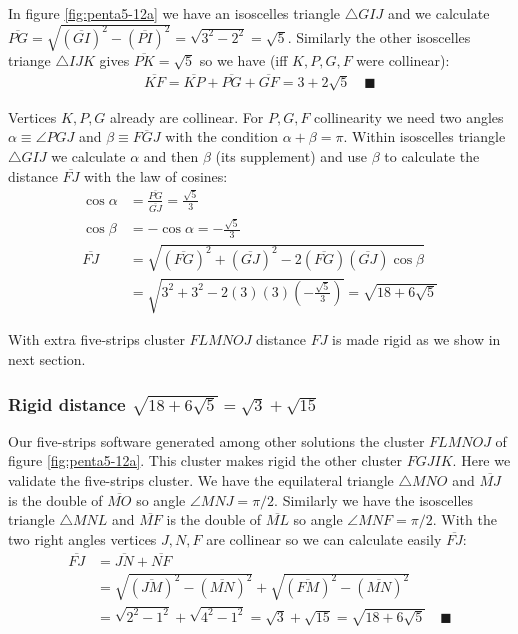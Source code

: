 \documentclass[11pt]{article}
\begin{document}
In figure \ref{fig:penta5-12a} we have an isoscelles triangle $\triangle{GIJ}$ and we calculate $\overline{PG} = \sqrt{(\overline{GI})^2 - (\overline{PI})^2} = \sqrt{3^2 - 2^2} = \sqrt5$. Similarly the other isoscelles triange $\triangle{IJK}$ gives $\overline{PK} = \sqrt{5}$ so we have (iff $K,P,G,F$ were collinear):
\begin{align}
\overline{KF} = \overline{KP} + \overline{PG} + \overline{GF} = 3 + 2\sqrt5 \quad \blacksquare
\end{align}

Vertices $K,P,G$ already are collinear. For $P,G,F$ collinearity we need two angles $\alpha \equiv \angle{PGJ}$ and $\beta \equiv \overline{FGJ}$ with the condition $\alpha + \beta = \pi$. Within isoscelles triangle $\triangle{GIJ}$ we calculate $\alpha$ and then $\beta$ (its supplement) and use $\beta$ to calculate the distance $\overline{FJ}$ with the law of cosines:
\begin{align}
\cos\alpha &= \frac{\overline{PG}}{\overline{GJ}} = \frac{\sqrt5}3 \\
\cos\beta &= -\cos\alpha = -\frac{\sqrt5}3 \\
\overline{FJ} &= \sqrt{(\overline{FG})^2 + (\overline{GJ})^2
 - 2(\overline{FG})(\overline{GJ})\cos\beta} \nonumber\\
 &= \sqrt{3^2 + 3^2 - 2(3)(3)\left(-\frac{\sqrt5}3\right)}
 = \sqrt{18 + 6\sqrt5}
\end{align}

With extra five-strips cluster $FLMNOJ$ distance $FJ$ is made rigid as we show in next section.

\subsubsection{Rigid distance $\sqrt{18+6\sqrt5} = \sqrt3 + \sqrt{15}$}

Our five-strips software generated among other solutions the cluster $FLMNOJ$ of figure \ref{fig:penta5-12a}. This cluster makes rigid the other cluster $FGJIK$. Here we validate the five-strips cluster. We have the equilateral triangle $\triangle{MNO}$ and $\overline{MJ}$ is the double of $\overline{MO}$ so angle $\angle{MNJ} = \pi/2$. Similarly we have the isoscelles triangle $\triangle{MNL}$ and $\overline{MF}$ is the double of $\overline{ML}$ so angle $\angle{MNF} = \pi/2$. With the two right angles vertices $J,N,F$ are collinear so we can calculate easily $\overline{FJ}$:
\begin{align}
\overline{FJ} &= \overline{JN} + \overline{NF} \nonumber\\
 &= \sqrt{(\overline{JM})^2 - (\overline{MN})^2} 
  + \sqrt{(\overline{FM})^2 - (\overline{MN})^2} \nonumber\\
 &= \sqrt{2^2 - 1^2} + \sqrt{4^2 - 1^2} = \sqrt{3} + \sqrt{15} 
 = \sqrt{18 + 6\sqrt5} \quad \blacksquare
\end{align}
\end{document}

